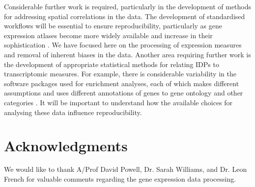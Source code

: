 Considerable further work is required, particularly in the development of methods for addressing spatial correlations in the data. The development of standardised workflows will be essential to ensure reproducibility, particularly as gene expression atlases become more widely available and increase in their sophistication \citep{Lein2007a,Harris2010,Miller2014}. We have focused here on the processing of expression measures and removal of inherent biases in the data. Another area requiring further work is the development of appropriate statistical methods for relating IDPs to transcriptomic measures. For example, there is considerable variability in the software packages used for enrichment analyses, each of which makes different assumptions and uses different annotations of genes to gene ontology and other categories \citep{Rhee2008}. It will be important to understand how the available choices for analysing these data influence reproducibility.

\section*{Acknowledgments}

We would like to thank A/Prof David Powell, Dr. Sarah Williams, and Dr. Leon French for valuable comments regarding the gene expression data processing.
